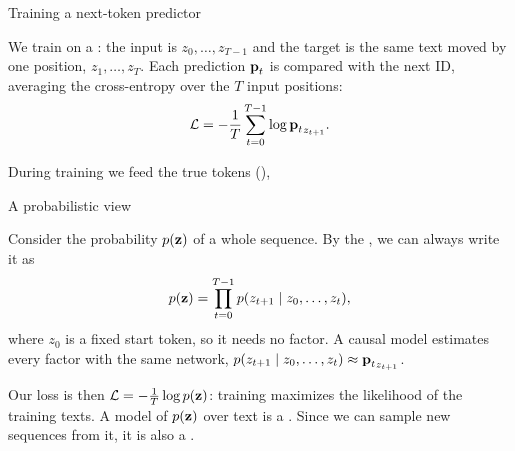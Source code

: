 
\begin{frame}{Training a next-token predictor}
    \setlength{\parskip}{3pt}
    \setlength{\abovedisplayskip}{4pt}
    \setlength{\belowdisplayskip}{4pt}

    We train on a : the input is $z_0,\ldots,z_{T-1}$
    and the target is the same text moved by one position, $z_1,\ldots,z_T$.
    Each prediction $\boldsymbol{\mathbf{p}}_t$ is compared with the next ID, averaging the
    cross-entropy over the $T$ input positions:
    \[
        \mathcal{L}=-\frac{1}{T}\sum_{t=0}^{T-1}
        \log{\boldsymbol{\mathbf{p}}_t}_{z_{t+1}}.
    \]

    During training we feed the true tokens (), 

\end{frame}

\begin{frame}{A probabilistic view}
    \setlength{\parskip}{4pt}
    \setlength{\abovedisplayskip}{6pt}
    \setlength{\belowdisplayskip}{6pt}

    Consider the probability $p(\boldsymbol{\mathbf{z}})$ of a whole sequence. By the , we can always write it as
    \[
        p(\boldsymbol{\mathbf{z}})=\prod_{t=0}^{T-1}p(z_{t+1}\mid z_0,\ldots,z_t),
    \]
    where $z_0$ is a fixed start token, so it needs no factor. A causal model estimates every factor
    with the same network, $p(z_{t+1}\mid z_0,\ldots,z_t)\approx{\boldsymbol{\mathbf{p}}_t}_{z_{t+1}}$.

    Our loss is then $\mathcal{L}=-\frac{1}{T}\log p(\boldsymbol{\mathbf{z}})$: training
    maximizes the likelihood of the training texts. A model of $p(\boldsymbol{\mathbf{z}})$
    over text is a . Since we can sample new sequences
    from it, it is also a .


\end{frame}

